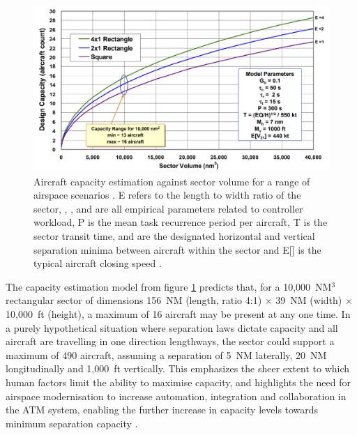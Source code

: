 \begin{figure}[H]
  \centering
  \includegraphics[width=0.65\linewidth]{cap_vs_vol.pdf}
  \caption{Aircraft capacity estimation against sector volume for a range of airspace scenarios \cite{Welch2007}. E refers to the length to width ratio of the sector, , ,  and  are all empirical parameters related to controller workload, P is the mean task recurrence period per aircraft, T is the sector transit time,  and  are the designated horizontal and vertical separation minima between aircraft within the sector and E[] is the typical aircraft closing speed \cite{Andrews1997}.}
  \label{cap_vs_vol}
\end{figure}

The capacity estimation model from figure \ref{cap_vs_vol} predicts that, for a 10,000~NM$^3$ rectangular sector of dimensions 156~NM (length, ratio 4:1) $\times$ 39~NM (width) $\times$ 10,000~ft (height), a maximum of 16 aircraft may be present at any one time. In a purely hypothetical situation where separation laws dictate capacity and all aircraft are travelling in one direction lengthways, the sector could support a maximum of 490 aircraft, assuming a separation of 5~NM laterally, 20~NM longitudinally and 1,000~ft vertically. This emphasizes the sheer extent to which human factors limit the ability to maximise capacity, and highlights the need for airspace modernisation to increase automation, integration and collaboration in the ATM system, enabling the further increase in capacity levels towards minimum separation capacity \cite{Gardi2016}. 


